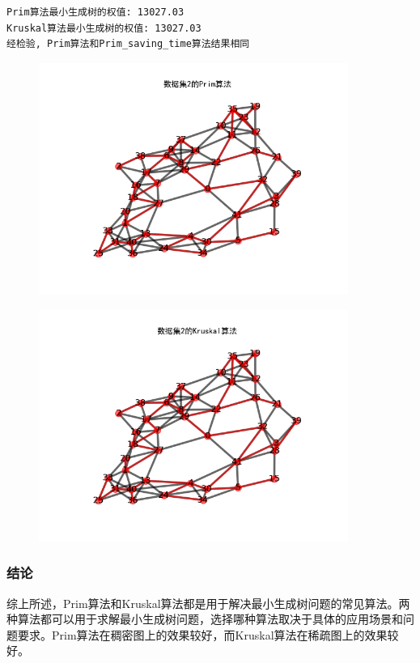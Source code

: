 \documentclass[lang=cn,11pt,a4paper]{elegantpaper}
\begin{document}
\begin{lstlisting}
Prim算法最小生成树的权值: 13027.03
Kruskal算法最小生成树的权值: 13027.03
经检验, Prim算法和Prim_saving_time算法结果相同
\end{lstlisting}

\begin{figure}[H]
    \centering
    \includegraphics[width=0.9\textwidth, height=0.38\textheight]{image/数据集2的Prim算法.png}
\end{figure}

\begin{figure}[H]
    \centering
    \includegraphics[width=0.9\textwidth, height=0.38\textheight]{image/数据集2的Kruskal算法.png}
\end{figure}

\subsubsection{结论}
综上所述，Prim算法和Kruskal算法都是用于解决最小生成树问题的常见算法。两种算法都可以用于求解最小生成树问题，选择哪种算法取决于具体的应用场景和问题要求。Prim算法在稠密图上的效果较好，而Kruskal算法在稀疏图上的效果较好。
\end{document}
